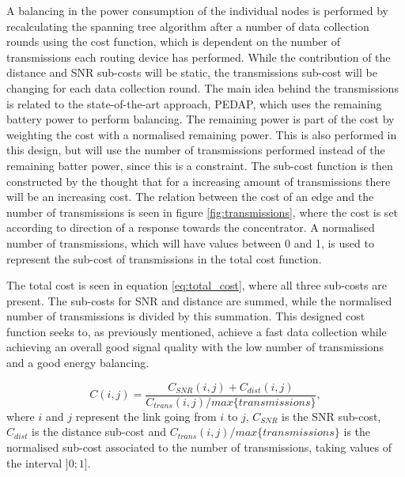 A balancing in the power consumption of the individual nodes is performed by recalculating the spanning tree algorithm after a number of data collection rounds using the cost function, which is dependent on the number of transmissions each routing device has performed. While the contribution of the distance and SNR sub-costs will be static, the transmissions sub-cost will be changing for each data collection round. The main idea behind the transmissions is related to the state-of-the-art approach, PEDAP, which uses the remaining battery power to perform balancing. The remaining power is part of the cost by weighting the cost with a normalised remaining power. This is also performed in this design, but will use the number of transmissions performed instead of the remaining batter power, since this is a constraint. The sub-cost function is then constructed by the thought that for a increasing amount of transmissions there will be an increasing cost. The relation between the cost of an edge and the number of transmissions is seen in figure \ref{fig:transmissions}, where the cost is set according to direction of a response towards the concentrator. A normalised number of transmissions, which will have values between 0 and 1, is used to represent the sub-cost of transmissions in the total cost function.


The total cost is seen in equation \ref{eq:total_cost}, where all three sub-costs are present. The sub-costs for SNR and distance are summed, while the normalised number of transmissions is divided by this summation. This designed cost function seeks to, as previously mentioned, achieve a fast data collection while achieving an overall good signal quality with the low number of transmissions and a good energy balancing.

\begin{equation}
C(i,j) = \frac{C_{SNR}(i,j)+C_{dist}(i,j)}{C_{trans}(i,j)/max\{transmissions\}},
\label{eq:total_cost}
\end{equation}
where $i$ and $j$ represent the link going from $i$ to $j$, $C_{SNR}$ is the SNR sub-cost, $C_{dist}$ is the distance sub-cost and $C_{trans}(i,j)/max\{transmissions\}$ is the normalised sub-cost associated to the number of transmissions, taking values of the interval $]0;1]$.
